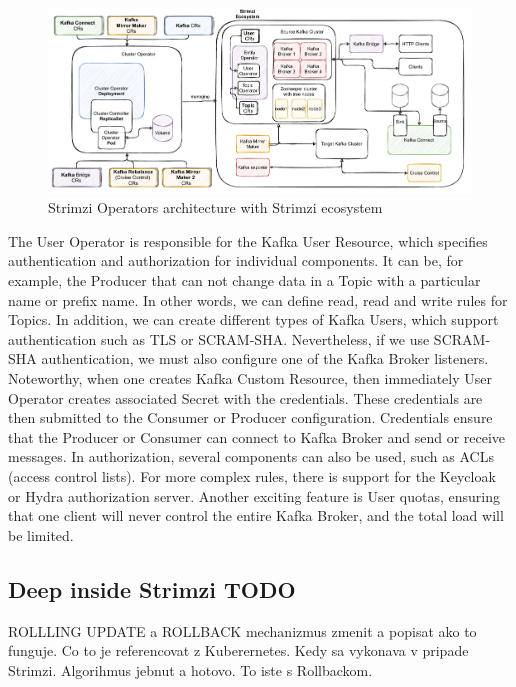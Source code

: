 \begin{figure}[!ht]
    \centering
    \includegraphics[scale=0.60]{obrazky-figures/02-preliminaries/03-strimzi/04-stirmziOperatorsArch.pdf}
    \caption{Strimzi Operators architecture with Strimzi ecosystem}
    \label{03:fig:strimziOperatorsArchitecture}
\end{figure}

The User Operator is responsible for the Kafka User Resource, which specifies authentication and authorization for individual components. It can be, for example, the Producer that can not change data in a Topic with a particular name or prefix name. In other words, we can define read, read and write rules for Topics. In addition, we can create different types of Kafka Users, which support authentication such as TLS or SCRAM-SHA. Nevertheless, if we use SCRAM-SHA authentication, we must also configure one of the Kafka Broker listeners. Noteworthy, when one creates Kafka Custom Resource, then immediately User Operator creates associated Secret with the credentials. These credentials are then submitted to the Consumer or Producer configuration. Credentials ensure that the Producer or Consumer can connect to Kafka Broker and send or receive messages. In authorization, several components can also be used, such as ACLs (access control lists). For more complex rules, there is support for the Keycloak or Hydra authorization server. Another exciting feature is User quotas, ensuring that one client will never control the entire Kafka Broker, and the total load will be limited.

\subsection*{Deep inside Strimzi TODO}

ROLLLING UPDATE a ROLLBACK mechanizmus zmenit a popisat ako to funguje. Co to je referencovat z Kuberernetes. Kedy sa vykonava v pripade Strimzi. Algorihmus jebnut a hotovo. To iste s Rollbackom.


